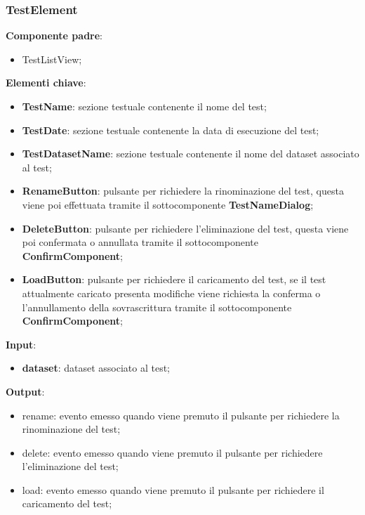 \subsubsection{TestElement}
\textbf{Componente padre}:
\begin{itemize}
    \item TestListView;
\end{itemize}
\textbf{Elementi chiave}:
\begin{itemize}
    \item \textbf{TestName}: sezione testuale contenente il nome del test;
    \item \textbf{TestDate}: sezione testuale contenente la data di esecuzione del test;
    \item \textbf{TestDatasetName}: sezione testuale contenente il nome del dataset associato al test;
    \item \textbf{RenameButton}: pulsante per richiedere la rinominazione del test, questa viene poi effettuata tramite il sottocomponente \textbf{TestNameDialog};
    \item \textbf{DeleteButton}: pulsante per richiedere l'eliminazione del test, questa viene poi confermata o annullata tramite il sottocomponente \textbf{ConfirmComponent};
    \item \textbf{LoadButton}: pulsante per richiedere il caricamento del test, se il test attualmente caricato presenta modifiche viene richiesta la conferma o l'annullamento della sovrascrittura tramite il sottocomponente \textbf{ConfirmComponent};
\end{itemize}
\textbf{Input}:
\begin{itemize}
    \item \textbf{dataset}: dataset associato al test;
\end{itemize}
\textbf{Output}:
\begin{itemize}
    \item rename: evento emesso quando viene premuto il pulsante per richiedere la rinominazione del test;
    \item delete: evento emesso quando viene premuto il pulsante per richiedere l'eliminazione del test;
    \item load: evento emesso quando viene premuto il pulsante per richiedere il caricamento del test;
\end{itemize}
